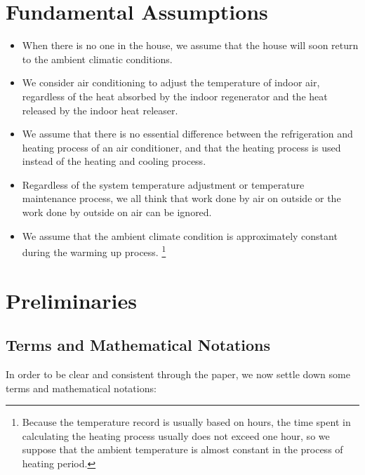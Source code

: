 \documentclass{mcmthesis}
\begin{document}
	\section{Fundamental Assumptions}
		\begin{itemize}
			\item When there is no one in the house, we assume that the house will soon return to the ambient climatic conditions.
			
			\item We consider air conditioning to adjust the temperature of indoor air, regardless of the heat absorbed by the indoor regenerator and the heat released by the indoor heat releaser.
			
			\item We assume that there is no essential difference between the refrigeration and heating process of an air conditioner, and that the heating process is used instead of the heating and cooling process.
			
			\item Regardless of the system temperature adjustment or temperature maintenance process, we all think that work done by air on outside or the  work done by outside on air can be ignored.
			
			\item We assume that the ambient climate condition is approximately constant during the warming up process.
			\footnote{Because the temperature record is usually based on hours, the time spent in calculating the heating process usually does not exceed one hour, so we suppose that the ambient temperature is almost constant in the process of heating period.}
			
		\end{itemize}
	
		
	
	\section{Preliminaries}
		\subsection{Terms and Mathematical Notations}
		
		In order to be clear and consistent through the paper, we now settle down some terms	and mathematical notations:
		
\end{document}
